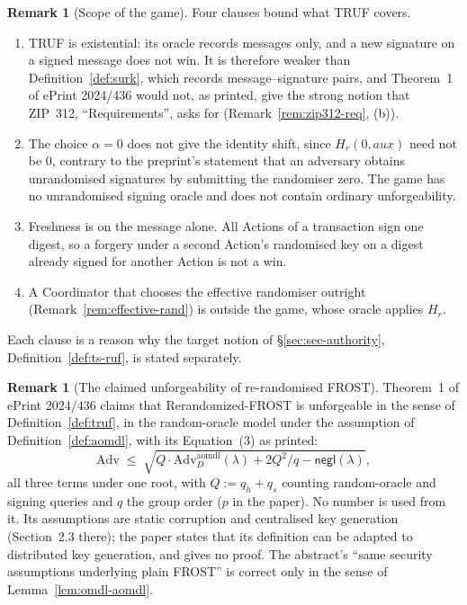 \documentclass[11pt,a4paper]{article}
\theoremstyle{definition}
\newtheorem{remark}[theorem]{Remark}
\newcommand{\negl}{\mathsf{negl}}
\begin{document}
\begin{remark}[Scope of the game]\label{rem:truf-scope}
Four clauses bound what TRUF covers.
\begin{enumerate}
\item[(a)] TRUF is existential: its oracle records messages only, and a new
  signature on a signed message does not win. It is therefore weaker than
  Definition~\ref{def:surk}, which records message--signature pairs, and
  Theorem~1 of ePrint 2024/436 would not, as printed, give the strong notion
  that ZIP~312, ``Requirements'', asks for (Remark~\ref{rem:zip312-req},
  (b)).
\item[(b)] The choice \(\alpha = 0\) does not give the identity shift, since
  \(H_r(0, \mathit{aux})\) need not be \(0\), contrary to the preprint's
  statement that an adversary obtains unrandomised signatures by submitting
  the randomiser zero. The game has no unrandomised signing oracle and does
  not contain ordinary unforgeability.
\item[(c)] Freshness is on the message alone. All Actions of a transaction
  sign one digest, so a forgery under a second Action's randomised key on a
  digest already signed for another Action is not a win.
\item[(d)] A Coordinator that chooses the effective randomiser outright
  (Remark~\ref{rem:effective-rand}) is outside the game, whose oracle
  applies \(H_r\).
\end{enumerate}
Each clause is a reason why the target notion of \S\ref{sec:sec-authority},
Definition~\ref{def:ts-ruf}, is stated separately.
\end{remark}

\begin{remark}[The claimed unforgeability of re-randomised FROST]
\label{rem:rr-claim}
Theorem~1 of ePrint 2024/436 claims that Rerandomized-FROST is unforgeable
in the sense of Definition~\ref{def:truf}, in the random-oracle model under
the assumption of Definition~\ref{def:aomdl}, with its Equation~(3) as
printed:
\[
  \mathrm{Adv} \;\le\; \sqrt{Q \cdot \mathrm{Adv}^{\mathrm{aomdl}}_{D}
    (\lambda) + 2 Q^{2} / q - \negl(\lambda)} ,
\]
all three terms under one root, with \(Q := q_h + q_s\) counting
random-oracle and signing queries and \(q\) the group order (\(p\) in the
paper). No number is used from it. Its assumptions are static corruption
and centralised key generation (Section~2.3 there); the paper states that
its definition can be adapted to distributed key generation, and gives no
proof. The abstract's ``same security assumptions underlying plain FROST''
is correct only in the sense of Lemma~\ref{lem:omdl-aomdl}.
\end{remark}
\end{document}
